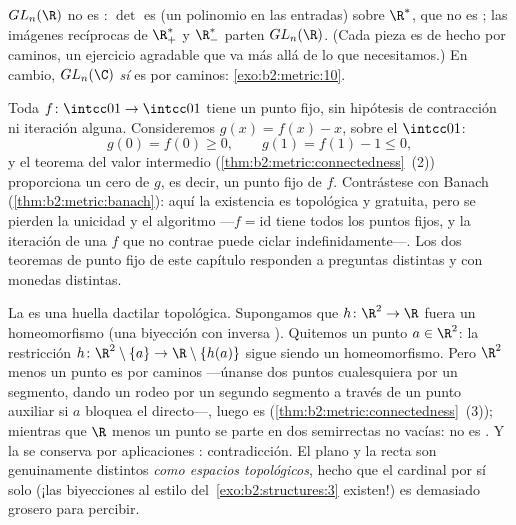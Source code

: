 \begin{example}\label{ex:b2:metric:glnr}
$GL_n(\R)$ no es : $\det$ es  (un polinomio en las
entradas) sobre $\R^*$, que no es ; las imágenes recíprocas
de $\R_+^*$ y $\R_-^*$ parten $GL_n(\R)$. (Cada pieza es de hecho
 por caminos, un ejercicio agradable que va más allá de lo
que necesitamos.) En cambio, $GL_n(\C)$ \emph{sí} es  por
caminos: \cref{exo:b2:metric:10}.
\end{example}

\begin{example}\label{ex:b2:metric:ivtfixed}
Toda $f \colon \intcc01 \to \intcc01$  tiene un punto fijo,
sin hipótesis de contracción ni iteración alguna. Consideremos
$g(x) = f(x) - x$,  sobre el  $\intcc01$:
\[
g(0) = f(0) \geq 0,
\qquad
g(1) = f(1) - 1 \leq 0 ,
\]
y el teorema del valor intermedio
(\cref{thm:b2:metric:connectedness}~(2)) proporciona un cero de
$g$, es decir, un punto fijo de $f$. Contrástese con Banach
(\cref{thm:b2:metric:banach}): aquí la existencia es topológica y
gratuita, pero se pierden la unicidad y el algoritmo ---$f =
\mathrm{id}$ tiene todos los puntos fijos, y la iteración de una $f$
que no contrae puede ciclar indefinidamente---. Los dos teoremas de
punto fijo de este capítulo responden a preguntas distintas y con
monedas distintas.
\end{example}

\begin{example}\label{ex:b2:metric:rnotr2}
La  es una huella dactilar topológica. Supongamos que $h
\colon \R^2 \to \R$ fuera un homeomorfismo (una biyección 
con inversa ). Quitemos un punto $a \in \R^2$: la
restricción $h \colon \R^2\setminus\{a\} \to \R\setminus\{h(a)\}$
sigue siendo un homeomorfismo. Pero $\R^2$ menos un punto es
 por caminos ---únanse dos puntos cualesquiera por un
segmento, dando un rodeo por un segundo segmento a través de un
punto auxiliar si $a$ bloquea el directo---, luego es 
(\cref{thm:b2:metric:connectedness}~(3)); mientras que $\R$ menos un
punto se parte en dos semirrectas  no vacías: no es
. Y la  se conserva por aplicaciones :
contradicción. El plano y la recta son genuinamente distintos
\emph{como espacios topológicos}, hecho que el cardinal por sí solo
(¡las biyecciones al estilo del~\cref{exo:b2:structures:3} existen!)
es demasiado grosero para percibir.
\end{example}

